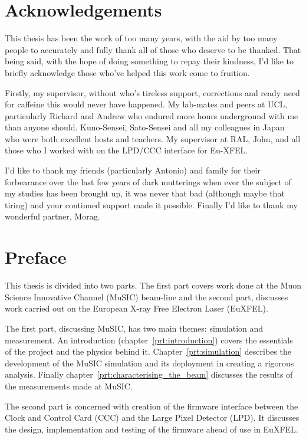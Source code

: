 \chapter*{Acknowledgements} %
\label{cha:acknowledgements}

This thesis has been the work of too many years, with the aid by too many people to accurately and fully thank all of those who deserve to be thanked. That being said, with the hope of doing something to repay their kindness, I'd like to briefly acknowledge those who've helped this work come to fruition.

Firstly, my supervisor, without who's tireless support, corrections and ready need for caffeine this would never have happened. My lab-mates and peers at UCL, particularly Richard and Andrew who endured more hours underground with me than anyone should. Kuno-Sensei, Sato-Sensei and all my colleagues in Japan who were both excellent hosts and teachers. My supervisor at RAL, John, and all those who I worked with on the LPD/CCC interface for Eu-XFEL.

I'd like to thank my friends (particularly Antonio) and family for their forbearance over the last few years of dark mutterings when ever the subject of my studies has been brought up, it was never that bad (although maybe that tiring) and your continued support made it possible. Finally I'd like to thank my wonderful partner, Morag.

\chapter*{Preface} %
\label{cha:preface}
This thesis is divided into two parts. The first part covers work done at the Muon Science Innovative Channel (MuSIC) beam-line and the second part, discusses work carried out on the European X-ray Free Electron Laser (EuXFEL).

The first part, discussing MuSIC, has two main themes: simulation and measurement. An introduction (chapter~\ref{prt:introduction}) covers the essentials of the project and the physics behind it. Chapter~\ref{prt:simulation} describes the development of the MuSIC simulation  and its deployment in creating a rigorous analysis. Finally chapter~\ref{prt:characterising_the_beam} discusses the results of the measurements made at MuSIC.

The second part is concerned with creation of the firmware interface between the Clock and Control Card (CCC) and the Large Pixel Detector (LPD). It discusses the design, implementation and testing of the firmware ahead of use in EuXFEL.

